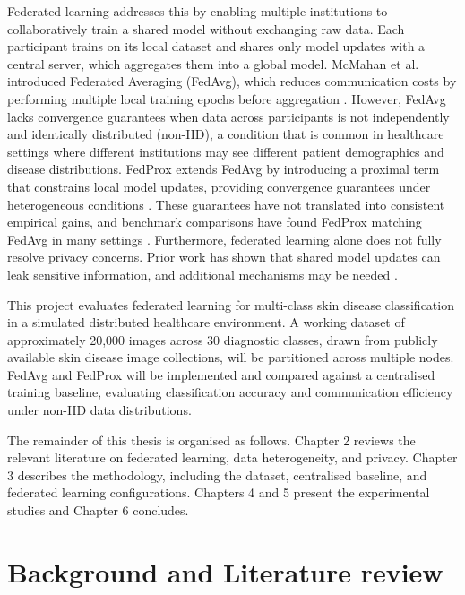 \documentclass[12pt,openany,a4paper]{book}
\begin{document}
  Federated learning addresses this by enabling multiple institutions to collaboratively train a shared model without exchanging raw data. Each participant trains on its local dataset and shares only model updates with a central server, which aggregates them into a global model. McMahan et al. introduced Federated Averaging (FedAvg), which reduces communication costs by performing multiple local training epochs before aggregation \cite{mcmahanCommunicationEfficientLearningDeep2023}. However, FedAvg lacks convergence guarantees when data across participants is not independently and identically distributed (non-IID), a condition that is common in healthcare settings where different institutions may see different patient demographics and disease distributions. FedProx extends FedAvg by introducing a proximal term that constrains local model updates, providing convergence guarantees under heterogeneous conditions \cite{liFederatedOptimizationHeterogeneous2020}. These guarantees have not translated into consistent empirical gains, and benchmark comparisons have found FedProx matching FedAvg in many settings \cite{liFederatedLearningNonIID2021}. Furthermore, federated learning alone does not fully resolve privacy concerns. Prior work has shown that shared model updates can leak sensitive information, and additional mechanisms may be needed \cite{kaissisSecurePrivacypreservingFederated2020}.

  This project evaluates federated learning for multi-class skin disease classification in a simulated distributed healthcare environment. A working dataset of approximately 20,000 images across 30 diagnostic classes, drawn from publicly available skin disease image collections, will be partitioned across multiple nodes. FedAvg and FedProx will be implemented and compared against a centralised training baseline, evaluating classification accuracy and communication efficiency under non-IID data distributions.

  The remainder of this thesis is organised as follows. Chapter 2 reviews the relevant literature on federated learning, data heterogeneity, and privacy. Chapter 3 describes the methodology, including the dataset, centralised baseline, and federated learning configurations. Chapters 4 and 5 present the experimental studies and Chapter 6 concludes.

\chapter{Background and Literature review}
\end{document}
